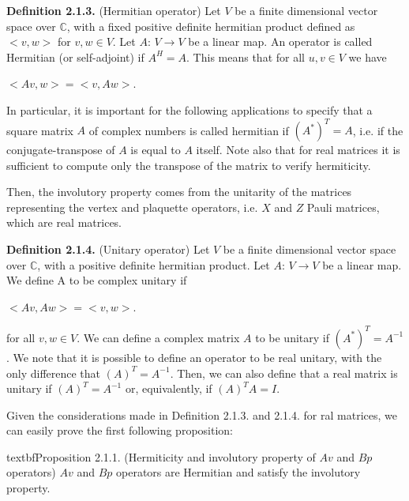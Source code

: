 \documentclass[12pt]{report}
\begin{document}
	
	\begin{minipage}{1\textwidth}	
		
		
		\textbf{Definition 2.1.3.} (Hermitian operator) Let $V$ be  a finite dimensional vector space over $\mathbb{C}$, with a fixed positive definite hermitian product defined as $<v,w>$ for $v,w \in V$. Let $A$: $V \rightarrow V$ be a linear map. An operator is called Hermitian (or self-adjoint) if $A^H=A$. This means that for all $u,v \in V$ we have\newline
		
		\begin{center}
			$<Av,w> = <v,Aw>$.
		\end{center}
		
		In particular, it is important for the following applications to specify that a square matrix $A$ of complex numbers is called hermitian if $(A^*)^T = A$, i.e. if the conjugate-transpose of $A$ is equal to $A$ itself. Note also that for real matrices it is sufficient to compute only the transpose of the matrix to verify hermiticity. \newline
		
		Then, the involutory property comes from the unitarity of the matrices representing the vertex and plaquette operators, i.e. $X$ and $Z$ Pauli matrices, which are real matrices. \newline
		
		\textbf{Definition 2.1.4.} (Unitary operator) Let $V$ be  a finite dimensional vector space over $\mathbb{C}$, with a positive definite hermitian product. Let $A$: $V \rightarrow V$ be a linear map. We define A to be complex unitary if \newline
		
		\begin{center}
			$<Av,Aw> = <v,w>$.
		\end{center}
		
		for all $v,w \in V$. We can define a complex matrix $A$ to be unitary if $ (A^*)^T=A^{-1}$. We note that it is possible to define an operator to be real unitary, with the only difference that $(A)^T = A^{-1}$. Then, we can also define that a real matrix is unitary if $(A)^T = A^{-1}$ or, equivalently, if $(A)^T A=I$.\newline
		
		Given the considerations made in Definition 2.1.3. and 2.1.4. for ral matrices, we can easily prove the first following proposition: \newline
		
		textbf{Proposition 2.1.1.} (Hermiticity and involutory property of $Av$ and $Bp$ operators)
		$Av$ and $Bp$ operators are Hermitian and satisfy the involutory property.\newline
		

\end{minipage}
\end{document}
